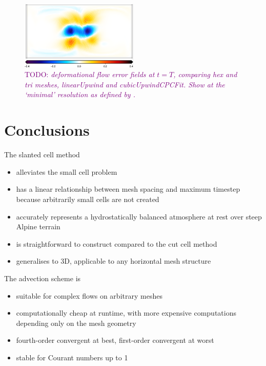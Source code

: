 \documentclass{article}
\newcommand{\TODO}[1]{\textcolor{purple}{TODO: \emph{#1}}}
\begin{document}
\begin{figure}
	\includegraphics[width=0.5\textwidth]{hexError.png}
	\caption{\TODO{deformational flow error fields at $t=T$, comparing hex and tri meshes, linearUpwind and cubicUpwindCPCFit.  Show at the `minimal' resolution as defined by \citet{lauritzen2012}.}}
\end{figure}


\section{Conclusions}

The slanted cell method
\begin{itemize}
	\item alleviates the small cell problem
	\item has a linear relationship between mesh spacing and maximum timestep because arbitrarily small cells are not created
	\item accurately represents a hydrostatically balanced atmosphere at rest over steep Alpine terrain
	\item is straightforward to construct compared to the cut cell method
	\item generalises to 3D, applicable to any horizontal mesh structure
\end{itemize}

The advection scheme is
\begin{itemize}
	\item suitable for complex flows on arbitrary meshes
	\item computationally cheap at runtime, with more expensive computations depending only on the mesh geometry
	\item fourth-order convergent at best, first-order convergent at worst
	\item stable for Courant numbers up to 1
\end{itemize}
\end{document}
